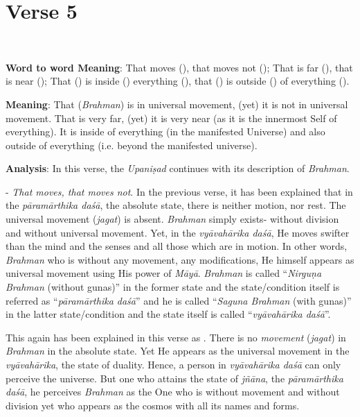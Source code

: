\chapter{Verse 5}

\\

\textbf{Word to word Meaning}: That moves (), that moves not (); That is far (), that is near (); That () is inside () everything (), that () is outside () of everything ().

\textbf{Meaning}: That (\emph{Brahman}) is in universal movement, (yet) it is not in universal movement. That is very far, (yet) it is very near (as it is the innermost Self of everything). It is inside of everything (in the manifested Universe) and also outside of everything (i.e. beyond the manifested universe).

\textbf{Analysis}: In this verse, the \emph{Upaniṣad} continues with its description of \emph{Brahman}.

- \emph{That moves, that moves not}. In the previous verse, it has been explained that in the \emph{pāramārthika daśā}, the absolute state, there is neither motion, nor rest. The universal movement (\emph{jagat}) is absent. \emph{Brahman} simply exists- without division and without universal movement. Yet, in the \emph{vyāvahārika daśā}, He moves swifter than the mind and the senses and all those which are in motion. In other words, \emph{Brahman} who is without any movement, any modifications, He himself appears as universal movement using His power of \emph{Māyā}. \emph{Brahman} is called ``\emph{Nirguṇa Brahman} (without gunas)'' in the former state and the state/condition itself is referred as ``\emph{pāramārthika daśā}'' and he is called ``\emph{Saguna Brahman} (with gunas)'' in the latter state/condition and the state itself is called ``\emph{vyāvahārika daśā}''.

This again has been explained in this verse as . There is no \emph{movement} (\emph{jagat}) in \emph{Brahman} in the absolute state. Yet He appears as the universal movement in the \emph{vyāvahārika}, the state of duality. Hence, a person in \emph{vyāvahārika daśā} can only perceive the universe. But one who attains the state of \emph{jñāna}, the \emph{pāramārthika daśā}, he perceives \emph{Brahman} as the One who is without movement and without division yet who appears as the cosmos with all its names and forms.

